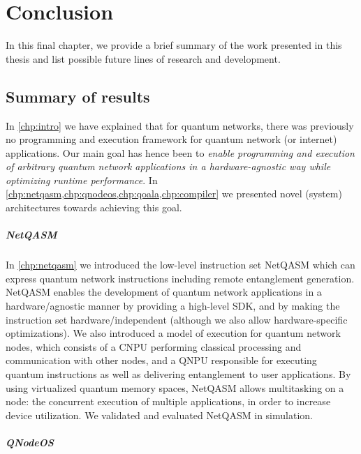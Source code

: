 \chapter{Conclusion}
\label{chp:conclusion}


In this final chapter, we provide a brief summary of the work presented in this thesis and list possible future lines of research and development.

\section{Summary of results}
In \cref{chp:intro} we have explained that for quantum networks, there was previously no programming and execution framework for quantum network (or internet) applications.
Our main goal has hence been to \emph{enable programming and execution of arbitrary quantum network applications in a hardware-agnostic way while optimizing runtime performance}.
In \cref{chp:netqasm,chp:qnodeos,chp:qoala,chp:compiler} we presented novel (system) architectures towards achieving this goal.


\paragraph{NetQASM}
In \cref{chp:netqasm} we introduced the low-level instruction set NetQASM which can express quantum network instructions including remote entanglement generation.
NetQASM enables the development of quantum network applications in a hardware\-/agnostic manner by providing a high-level SDK, and by making the instruction set hardware\-/independent (although we also allow hardware-specific optimizations).
We also introduced a model of execution for quantum network nodes, which consists of a CNPU performing classical processing and communication with other nodes, and a QNPU responsible for executing quantum instructions as well as delivering entanglement to user applications.
By using virtualized quantum memory spaces, NetQASM allows multitasking on a node: the concurrent execution of multiple applications, in order to increase device utilization.
We validated and evaluated NetQASM in simulation.


\paragraph{QNodeOS}

